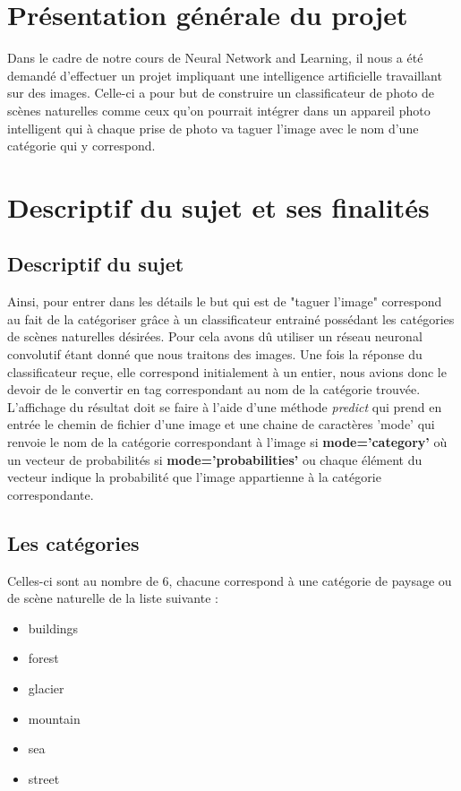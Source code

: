 \documentclass[12pt ,a4paper ]{article}
\begin{document}
\begin{multicols}{2} 
\section{Présentation générale du projet}
		Dans le cadre de notre cours de Neural Network and Learning, il nous a été demandé d'effectuer un projet impliquant une intelligence artificielle travaillant sur des images. Celle-ci a pour but de construire un classificateur de photo de scènes naturelles comme ceux qu’on pourrait intégrer dans un appareil photo intelligent qui à chaque prise de photo va taguer l’image avec le nom d’une catégorie qui y correspond. 
	
		
\section{Descriptif du sujet et ses finalités}
\subsection{Descriptif du sujet}
	Ainsi, pour entrer dans les détails le but qui est de "taguer l'image" correspond au fait de la catégoriser grâce à un classificateur entrainé possédant les catégories de scènes naturelles désirées. Pour cela avons dû utiliser un réseau neuronal convolutif étant donné que nous traitons des images. Une fois la réponse du classificateur reçue, elle correspond initialement à un entier, nous avions donc le devoir de le convertir en tag correspondant au nom de la catégorie trouvée. \\
	
	
	L'affichage du résultat doit se faire à l'aide d'une méthode \textit{predict} qui prend en entrée le chemin de fichier d’une image et une chaine de caractères 'mode' qui renvoie le nom de la catégorie correspondant à l'image si \textbf{mode='category'} où un vecteur de probabilités si \textbf{mode='probabilities'} ou chaque élément du vecteur indique la probabilité que l'image appartienne à la catégorie correspondante.

\subsection{Les catégories}
Celles-ci sont au nombre de 6, chacune correspond à une catégorie de paysage ou de scène naturelle de la liste suivante : 

\bigskip
\begin{itemize}
\item buildings
\item forest
\item glacier
\item mountain
\item sea
\item street
\end{itemize}


\end{multicols}
\end{document}
